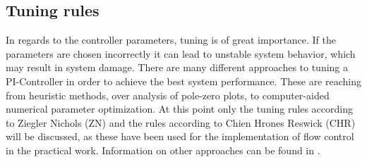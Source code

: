 \subsection{Tuning rules}
In regards to the controller parameters, tuning is of great importance. If the parameters are chosen incorrectly it can lead to unstable system behavior, which may result in system damage. There are many different approaches to tuning a PI-Controller in order to achieve the best system performance. These are reaching from heuristic methods, over analysis of pole-zero plots, to computer-aided numerical parameter optimization. \cite{Reg_10} At this point only the tuning rules according to Ziegler Nichols (ZN) and the rules according to Chien Hrones Reswick (CHR) will be discussed, as these have been used for the implementation of flow control in the practical work.  Information on other approaches can be found in \cite{Reg_11}.

